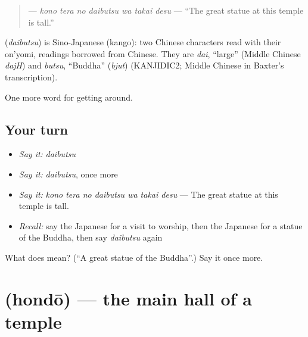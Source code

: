 \begin{quote}
\textbf{   } — \emph{kono tera no daibutsu wa takai desu} — \textquotedblleft{}The great statue at this temple is tall.\textquotedblright{}
\end{quote}

\begin{cousinweb}
\textbf{} (\emph{daibutsu}) is Sino-Japanese (kango): two Chinese characters read with their on'yomi, readings borrowed from Chinese. They are \emph{dai}, \textquotedblleft{}large\textquotedblright{} (Middle Chinese \emph{dajH}) and \emph{butsu}, \textquotedblleft{}Buddha\textquotedblright{} (\emph{bjut}) (KANJIDIC2; Middle Chinese in Baxter's transcription).
\end{cousinweb}

\begin{grammarlens}[title={What you've built}]
One more word for getting around.
\end{grammarlens}

\subsection*{Your turn}
\begin{itemize}
\raggedright
  \item \emph{Say it:} \emph{daibutsu}
  \item \emph{Say it:} \emph{daibutsu}, once more
  \item \emph{Say it:} \emph{kono tera no daibutsu wa takai desu} — The great statue at this temple is tall.
  \item \emph{Recall:} say the Japanese for a visit to worship, then the Japanese for a statue of the Buddha, then say \emph{daibutsu} again
\end{itemize}

\begin{tcolorbox}[breakable,colback=teal!4,colframe=teal!35!black,title={Before you move on}]
What does  mean? (\textquotedblleft{}A great statue of the Buddha\textquotedblright{}.) Say it once more.
\end{tcolorbox}
\section[\texorpdfstring{\ja{ほんどう} (hondō)}{ほんどう (hondō)}]{ (hondō) — the main hall of a temple}

\label{lesson:JA-C407-hondou}



